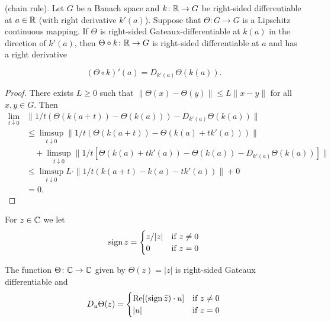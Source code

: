 \begin{proposition} \label{prop:b2-2.3}
(chain rule). Let $G$ be a Banach space and $k \colon \mathbb{R} \to G$ be right-sided differentiable at $a \in \mathbb{R}$ (with right derivative $k'(a)$).
Suppose that $\Theta \colon G \to G$ is a Lipschitz continuous mapping.
If $\Theta$ is right-sided Gateaux-differentiable at $k(a)$ in the direction of $k'(a)$, then $\Theta \circ k \colon \mathbb{R} \to G$ is right-sided differentiable at $a$ and has a right derivative

\begin{equation}\label{eq:b2-2.4}
(\Theta \circ k)'(a) = D_{k'(a)}\Theta(k(a)).
\end{equation}
\end{proposition}
\begin{proof}
There exists $L \geq 0$ such that $\|\Theta(x) - \Theta(y)\| \leq L\|x - y\|$ for all $x,y \in G$.
Then
\[
\begin{array}{lll}
\lim_{t \downarrow 0} &\|1/t (\Theta(k(a+t)) - \Theta(k(a))) - D_{k'(a)}\Theta(k(a))\| \\
&\leq \limsup_{t \downarrow 0} \|1/t (\Theta(k(a+t)) - \Theta(k(a)+tk'(a)))\| \\
&\quad + \limsup_{t \downarrow 0} \|1/t [\Theta(k(a)+tk'(a)) - \Theta(k(a)) - D_{k'(a)}\Theta(k(a))]\| \\
&\leq \limsup_{t \downarrow 0} L \cdot \|1/t (k(a+t) - k(a)-tk'(a))\| + 0 \\
&= 0.
\end{array}
\]
\end{proof}
For $z \in \mathbb{C}$ we let
\begin{equation}\label{eq:b2-2.5}
\operatorname{sign} z = \begin{cases}
    z/|z| & \text{if } z \neq 0 \\
    0 & \text{if } z = 0
\end{cases}
\end{equation}

\begin{lemma}\label{lem:b2-2.4}
The function $\Theta \colon \mathbb{C} \to \mathbb{C}$ given by $\Theta(z) = |z|$ is right-sided Gateaux differentiable and
\begin{equation}\label{eq:b2-2.6}
D_{u}\Theta(z) = \begin{cases}
    \mathop{}\!\mathrm{Re}[(\operatorname{sign} \bar{z}) \cdot u] & \text{if } z \neq 0 \\
    |u| & \text{if } z = 0
\end{cases}
\end{equation}
\end{lemma}

